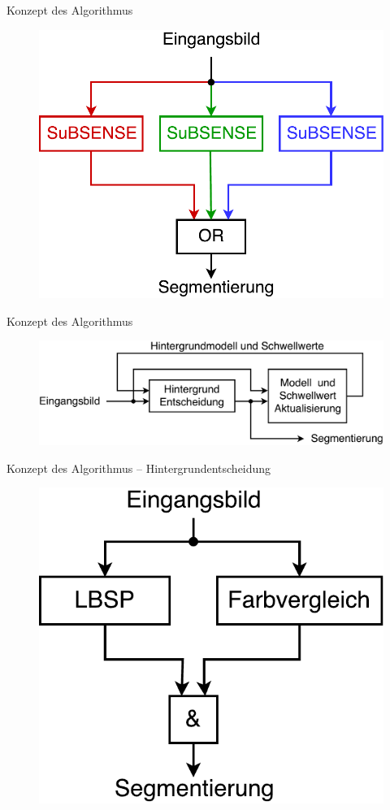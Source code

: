 \documentclass[hyperref={pdfpagelabels=false}]{beamer}
\begin{document}
\begin{frame}[t]{Konzept des Algorithmus}
	\begin{figure}
		\centering
		\includegraphics[width=0.8\linewidth]{Abbildungen/multiprocess.pdf}
		\label{fig:Abbildungen/Grid}
	\end{figure}
\end{frame}

\begin{frame}[t]{Konzept des Algorithmus}
	\bigskip
	\bigskip
	\bigskip 
	\begin{figure}
		\centering
		\includegraphics[width=1\linewidth]{Abbildungen/gesamt.pdf}
		\label{fig:Abbildungen/Grid}
	\end{figure}
\end{frame}


\begin{frame}[t]{Konzept des Algorithmus -- Hintergrundentscheidung}
	\begin{figure}
		\centering
		\includegraphics[width=0.6\linewidth]{Abbildungen/Konzept.pdf}
		\label{fig:Abbildungen/Grid}
	\end{figure}
\end{frame}
\end{document}
